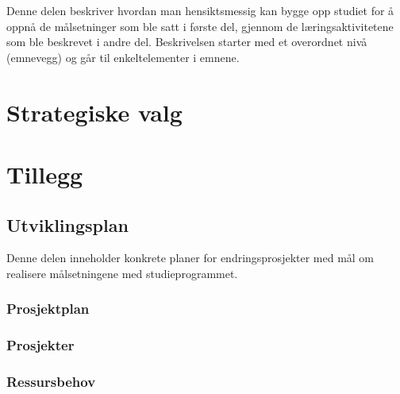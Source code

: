 \documentclass[a4paper, oneside, 12pt]{memoir}
\begin{document}
Denne delen beskriver hvordan man hensiktsmessig kan bygge opp studiet for å oppnå de målsetninger som ble satt i første del, gjennom de læringsaktivitetene som ble beskrevet i andre del. Beskrivelsen starter med et overordnet nivå (emnevegg) og går til enkeltelementer i emnene.

\part{Strategiske valg}

\ifappendix
\appendix

\renewcommand{\appendixtocname}{Tillegg}
\renewcommand{\appendixpagename}{Tillegg}
\part*{Tillegg}

\chapter{Utviklingsplan}

Denne delen inneholder konkrete planer for endringsprosjekter med mål om realisere målsetningene med studieprogrammet.

\section{Prosjektplan}

\section{Prosjekter}

	


	





\section{Ressursbehov}
\end{document}

